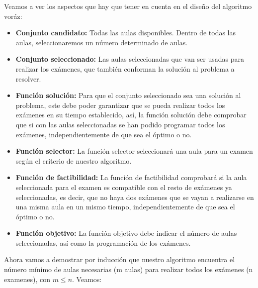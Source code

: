 \documentclass{article}
\begin{document}
    Veamos a ver los aspectos que hay que tener en cuenta en el diseño del algoritmo voráz:

    \begin{itemize}
        \item \textbf{Conjunto candidato: } Todas las aulas disponibles. Dentro de todas las aulas, seleccionaremos un número determinado de aulas.
        \item  \textbf{Conjunto seleccionado: } Las aulas seleccionadas que van ser usadas para realizar los exámenes, que también conforman la solución al problema a resolver.
        \item \textbf{Función solución: } Para que el conjunto seleccionado sea una solución al problema, este debe poder garantizar que se pueda realizar todos los exámenes en su tiempo 
        establecido, así, la función solución debe comprobar que si con las aulas seleccionadas se han podido programar todos los exámenes, independientemente de que sea el óptimo o no.
        \item \textbf{Función selector: } La función selector seleccionará una aula para un examen según el criterio de nuestro algoritmo. 
        \item \textbf{Función de factibilidad: } La función de factibilidad comprobará si la aula seleccionada para el examen
        es compatible con el resto de exámenes ya seleccionadas, es decir, que no haya dos exámenes que se vayan a realizarse en una misma aula en un mismo tiempo, independientemente de que sea el óptimo o no.
        \item \textbf{Función objetivo: } La función objetivo debe indicar el número de aulas seleccionadas, así como la programación de los exámenes.
        
    \end{itemize}

    Ahora vamos a demostrar por inducción que nuestro algoritmo encuentra el número mínimo de aulas necesarias (m aulas) para realizar todos los exámenes (n examenes), con $ m \leq n $. Veamos:
\end{document}
